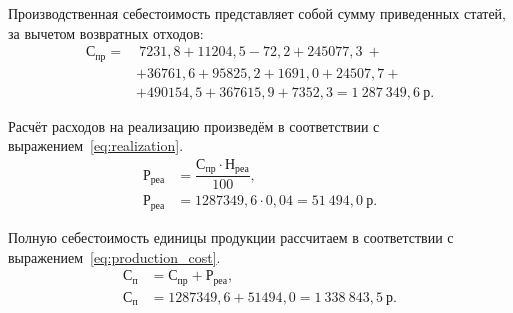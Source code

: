 Производственная себестоимость представляет собой сумму приведенных статей, за
вычетом возвратных отходов:
\begin{align}
  \text{С}_{\text{пр}} =&~7231{,}8 + 11204{,}5 - 72{,}2 + 245077{,}3~ + \\ \nonumber
    &+ 36761{,}6 + 95825{,}2 + 1691{,}0 + 24507{,}7 +             \\ \nonumber
    &+ 490154{,}5 + 367615{,}9 + 7352{,}3 = 1~287~349{,}6 \: \text{р.} \nonumber
\end{align}

Расчёт расходов на реализацию произведём в соответствии с
выражением~\ref{eq:realization}.
\begin{align}
  \label{eq:realization}
  \text{Р}_{\text{реа}} &= \dfrac{\text{С}_{\text{пр}} \cdot
    \text{Н}_{\text{реа}}}{100}, \\
  \text{Р}_{\text{реа}} &= 1287349{,}6 \cdot 0{,}04 =
    51~494{,}0 \: \text{р.} \nonumber
\end{align}

Полную себестоимость единицы продукции рассчитаем в соответствии с
выражением~\ref{eq:production_cost}.
\begin{align}
  \label{eq:production_cost}
  \text{С}_{\text{п}} &= \text{С}_{\text{пр}} + \text{Р}_{\text{реа}}, \\
  \text{С}_{\text{п}} &= 1287349{,}6 + 51494{,}0 =
    1~338~843{,}5 \: \text{р.} \nonumber
\end{align}

\newpage


